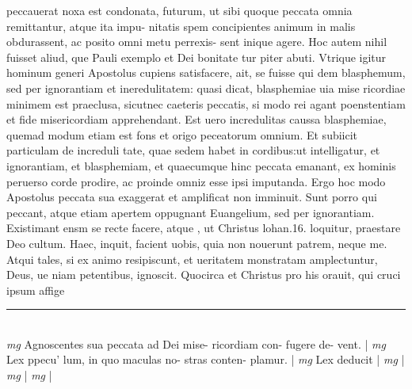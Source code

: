\documentclass{article}
\begin{document}
\begin{pages}
peccauerat noxa est condonata, futurum, ut sibi quoque  peccata omnia remittantur, atque  ita impu- nitatis spem concipientes animum in malis obdurassent, ac posito omni metu perrexis- sent inique agere. Hoc autem nihil fuisset aliud, que  Pauli exemplo et Dei bonitate tur piter abuti. Vtrique  igitur hominum generi Apostolus cupiens satisfacere, ait, se fuisse qui dem blasphemum, sed per ignorantiam et ineredulitatem: quasi dicat, blasphemiae uia mise ricordiae minimem est praeclusa, sicutnec caeteris peccatis, si modo rei agant poenstentiam et fide misericordiam apprehendant. Est uero incredulitas caussa blasphemiae, quemad modum etiam est fons et origo peceatorum omnium. Et subiicit particulam de increduli tate, quae sedem habet in cordibus:ut intelligatur, et ignorantiam, et blasphemiam, et quaecumque  hinc peccata emanant, ex hominis peruerso corde prodire, ac proinde omniz esse ipsi imputanda. Ergo hoc modo Apostolus peccata sua exaggerat et amplificat non imminuit. Sunt porro qui peccant, atque  etiam apertem oppugnant Euangelium, sed per ignorantiam. Existimant ensm se recte facere, atque , ut Christus lohan.16. loquitur, praestare Deo cultum. Haec, inquit, facient uobis, quia non nouerunt patrem, neque  me.   Atqui tales, si ex animo resipiscunt, et ueritatem monstratam amplectuntur, Deus, ue niam petentibus, ignoscit. Quocirca et Christus pro his orauit, qui cruci ipsum affige  \pend
\vspace{0.5cm}\noindent
\vspace{0.2cm}\rule{1cm}{0.2pt}\\ 
\hspace{0.2cm}\textit{mg}
\footnotesize Agnoscentes sua peccata ad Dei mise- ricordiam con- fugere de- vent. 
\normalsize| 
\hspace{0.2cm}\textit{mg}
\footnotesize Lex ppecu' lum, in quo maculas no- stras conten- plamur. 
\normalsize| 
\hspace{0.2cm}\textit{mg}
\footnotesize Lex deducit     
\normalsize| 
\hspace{0.2cm}\textit{mg}
\footnotesize            
\normalsize| 
\hspace{0.2cm}\textit{mg}
\footnotesize        
\normalsize| 
\hspace{0.2cm}\textit{mg}
\footnotesize         
\normalsize| 

\end{pages}
\end{document}

